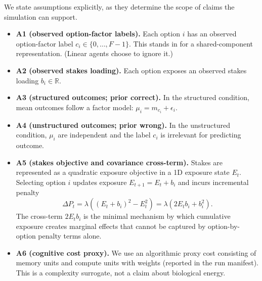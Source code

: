 \documentclass[11pt]{article}
\begin{document}
We state assumptions explicitly, as they determine the scope of claims the simulation can support.

\begin{itemize}[leftmargin=*]
  \item \textbf{A1 (observed option-factor labels).} Each option $i$ has an observed option-factor label $c_i\in\{0,\dots,F-1\}$. This stands in for a shared-component representation. (Linear agents choose to ignore it.)
  \item \textbf{A2 (observed stakes loading).} Each option exposes an observed stakes loading $b_i\in\mathbb{R}$.
  \item \textbf{A3 (structured outcomes; prior correct).} In the structured condition, mean outcomes follow a factor model: $\mu_i = m_{c_i} + \epsilon_i$.
  \item \textbf{A4 (unstructured outcomes; prior wrong).} In the unstructured condition, $\mu_i$ are independent and the label $c_i$ is irrelevant for predicting outcome.
  \item \textbf{A5 (stakes objective and covariance cross-term).} Stakes are represented as a quadratic exposure objective in a 1D exposure state $E_t$. Selecting option $i$ updates exposure $E_{t+1}=E_t+b_i$ and incurs incremental penalty
  \[
  \Delta P_t = \lambda\left((E_t+b_i)^2 - E_t^2\right)=\lambda(2E_tb_i+b_i^2).
  \]
  The cross-term $2E_tb_i$ is the minimal mechanism by which cumulative exposure creates marginal effects that cannot be captured by option-by-option penalty terms alone.
  \item \textbf{A6 (cognitive cost proxy).} We use an algorithmic proxy cost consisting of memory units and compute units with weights (reported in the run manifest). This is a complexity surrogate, not a claim about biological energy.
\end{itemize}
\end{document}

